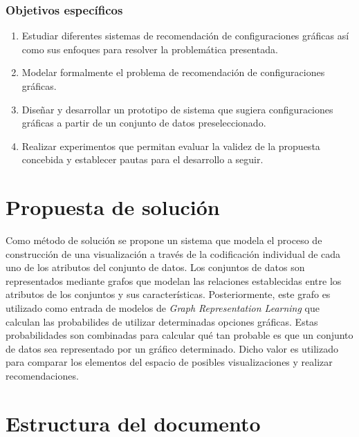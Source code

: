 \subsubsection{Objetivos espec\'ificos}
\begin{enumerate}
   \item Estudiar diferentes sistemas de recomendaci\'on de configuraciones
   gr\'aficas as\'i como sus enfoques para resolver la problem\'atica presentada.
    
    \item Modelar formalmente el problema de recomendaci\'on de configuraciones
    gr\'aficas.

    \item Dise\~nar y desarrollar un prototipo de sistema que sugiera configuraciones
    gr\'aficas a partir de un conjunto de datos preseleccionado.

    \item Realizar experimentos que permitan evaluar la validez de la propuesta
    concebida y establecer pautas para el desarrollo a seguir.

\end{enumerate}

\section*{Propuesta de soluci\'on}

Como m\'etodo de soluci\'on se propone un
sistema que modela el proceso de construcci\'on
de una visualizaci\'on a trav\'es de la codificaci\'on
individual de cada uno de los atributos del conjunto de datos. Los conjuntos
de datos son representados mediante grafos que modelan
las relaciones establecidas entre los atributos de los
conjuntos y sus caracter\'isticas. Posteriormente,
este grafo es utilizado como entrada de modelos
de \textit{Graph Representation Learning} que calculan las probabilides
de utilizar determinadas opciones gr\'aficas. Estas probabilidades
son combinadas para calcular qu\'e tan probable es que un conjunto de
datos sea representado por un gr\'afico determinado. Dicho valor
es utilizado para comparar los elementos del espacio de posibles
visualizaciones y realizar recomendaciones.


\section*{Estructura del documento}

